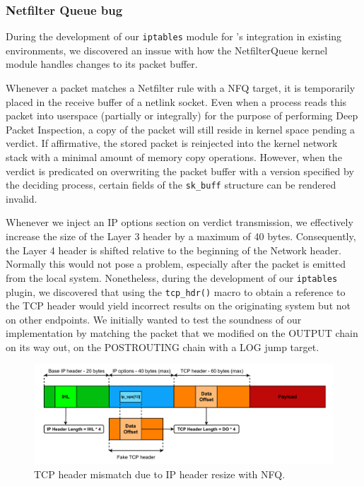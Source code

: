\subsubsection{Netfilter Queue bug}
\label{sign:linux:discussion:bug}

During the development of our \texttt{iptables} module for \daf{}'s integration in existing environments, we discovered an inssue with how the NetfilterQueue kernel module handles changes to its packet buffer.

Whenever a packet matches a Netfilter rule with a NFQ target, it is temporarily placed in the receive buffer of a netlink socket. Even when a process reads this packet into userspace (partially or integrally) for the purpose of performing Deep Packet Inspection, a copy of the packet will still reside in kernel space pending a verdict. If affirmative, the stored packet is reinjected into the kernel network stack with a minimal amount of memory copy operations. However, when the verdict is predicated on overwriting the packet buffer with a version specified by the deciding process, certain fields of the \texttt{sk\_buff} structure can be rendered invalid.

Whenever we inject an IP options section on verdict transmission, we effectively increase the size of the Layer 3 header by a maximum of 40 bytes. Consequently, the Layer 4 header is shifted relative to the beginning of the Network header. Normally this would not pose a problem, especially after the packet is emitted from the local system. Nonetheless, during the development of our \texttt{iptables} plugin, we discovered that using the \texttt{tcp\_hdr()} macro to obtain a reference to the TCP header would yield incorrect results on the originating system but not on other endpoints. We initially wanted to test the soundness of our implementation by matching the packet that we modified on the OUTPUT chain on its way out, on the POSTROUTING chain with a LOG jump target.

\begin{figure}
    \centering
    \includegraphics[width=\textwidth,keepaspectratio]{figures/daf-nfq-bug.pdf}
    \caption{TCP header mismatch due to IP header resize with NFQ.}
    \label{appfw:daf:fig:nfq-bug}
\end{figure}

